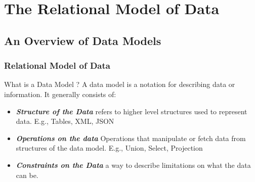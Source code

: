 \documentclass[12]{beamer}
\begin{document}
\section{The Relational Model of Data}

\subsection{An Overview of Data Models}

\begin{frame}
\frametitle{Relational Model of Data}
\begin{block}{What is a Data Model ?}
\vspace{10pt}
A data model is a notation for describing data or information. It generally consists of:
\begin{itemize}
\item \textit{\textbf{Structure of the Data}} refers to higher level structures used to represent data. E.g., Tables, XML, JSON
\item \textbf{\textit{Operations on the data}} Operations that manipulate or fetch data from structures of the data model. E.g., Union, Select, Projection
\item \textbf{\textit{Constraints on the Data}} a way to describe limitations on what the data can be.
\end{itemize}
\end{block}
\end{frame}
\end{document}
